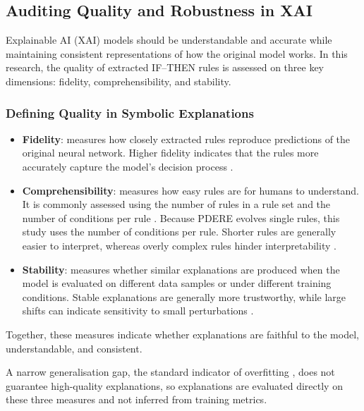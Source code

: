 \subsection{Auditing Quality and Robustness in XAI}\label{sec:auditing-quality-robustness}

Explainable AI (XAI) models should be understandable and accurate while maintaining consistent representations of how the original model works. In this research, the quality of extracted IF--THEN rules is assessed on three key dimensions: fidelity, comprehensibility, and stability.

\subsubsection{Defining Quality in Symbolic Explanations}

\begin{itemize}
\item \textbf{Fidelity}: measures how closely extracted rules reproduce predictions of the original neural network. Higher fidelity indicates that the rules more accurately capture the model's decision process \citep{guidotti2021,miro2025}.
\item \textbf{Comprehensibility}: measures how easy rules are for humans to understand. It is commonly assessed using the number of rules in a rule set \citep{yedjour2024} and the number of conditions per rule \citep{arrieta2020}. Because PDERE evolves single rules, this study uses the number of conditions per rule. Shorter rules are generally easier to interpret, whereas overly complex rules hinder interpretability \citep{yedjour2024}.
\item \textbf{Stability}: measures whether similar explanations are produced when the model is evaluated on different data samples or under different training conditions. Stable explanations are generally more trustworthy, while large shifts can indicate sensitivity to small perturbations \citep{ye2025}.
\end{itemize}

Together, these measures indicate whether explanations are faithful to the model, understandable, and consistent.

A narrow generalisation gap, the standard indicator of overfitting \citep{keskar2017}, does not guarantee high-quality explanations, so explanations are evaluated directly on these three measures and not inferred from training metrics.